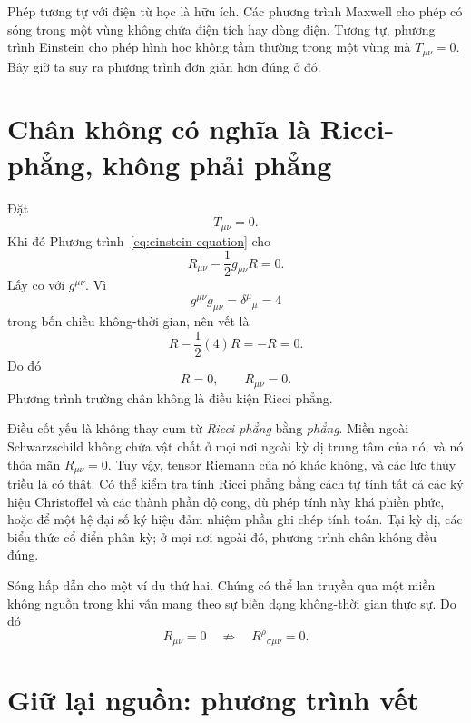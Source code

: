 Phép tương tự với điện từ học là hữu ích. Các phương trình Maxwell cho phép có sóng trong một vùng không chứa điện tích hay dòng điện. Tương tự, phương trình Einstein cho phép hình học không tầm thường trong một vùng mà \(T_{\mu\nu}=0\). Bây giờ ta suy ra phương trình đơn giản hơn đúng ở đó.

\section{Chân không có nghĩa là Ricci-phẳng, không phải phẳng}

Đặt
\begin{equation}
 T_{\mu\nu}=0.
\end{equation}
Khi đó Phương trình~\eqref{eq:einstein-equation} cho
\begin{equation}
 R_{\mu\nu}-\frac12g_{\mu\nu}R=0.
 \label{eq:vacuum-einstein}
\end{equation}
Lấy co với \(g^{\mu\nu}\). Vì
\begin{equation}
 g^{\mu\nu}g_{\mu\nu}
 =\delta^\mu{}_\mu=4
\end{equation}
trong bốn chiều không-thời gian, nên vết là
\begin{equation}
 R-\frac12(4)R=-R=0.
\end{equation}
Do đó
\begin{equation}
 R=0,
 \qquad
 R_{\mu\nu}=0.
 \label{eq:ricci-flat}
\end{equation}
Phương trình trường chân không là điều kiện Ricci phẳng.

Điều cốt yếu là không thay cụm từ \emph{Ricci phẳng} bằng \emph{phẳng}.
Miền ngoài Schwarzschild không chứa vật chất ở mọi nơi ngoài kỳ dị trung tâm của nó, và nó thỏa mãn \(R_{\mu\nu}=0\). Tuy vậy, tensor Riemann của nó khác không, và các lực thủy triều là có thật. Có thể kiểm tra tính Ricci phẳng bằng cách tự tính tất cả các ký hiệu Christoffel và các thành phần độ cong, dù phép tính này khá phiền phức, hoặc để một hệ đại số ký hiệu đảm nhiệm phần ghi chép tính toán. Tại kỳ dị, các biểu thức cổ điển phân kỳ; ở mọi nơi ngoài đó, phương trình chân không đều đúng.

Sóng hấp dẫn cho một ví dụ thứ hai. Chúng có thể lan truyền qua một miền không nguồn trong khi vẫn mang theo sự biến dạng không-thời gian thực sự. Do đó
\begin{equation}
 R_{\mu\nu}=0
 \quad\not\Rightarrow\quad
 R^\rho{}_{\sigma\mu\nu}=0.
\end{equation}

\section{Giữ lại nguồn: phương trình vết}

